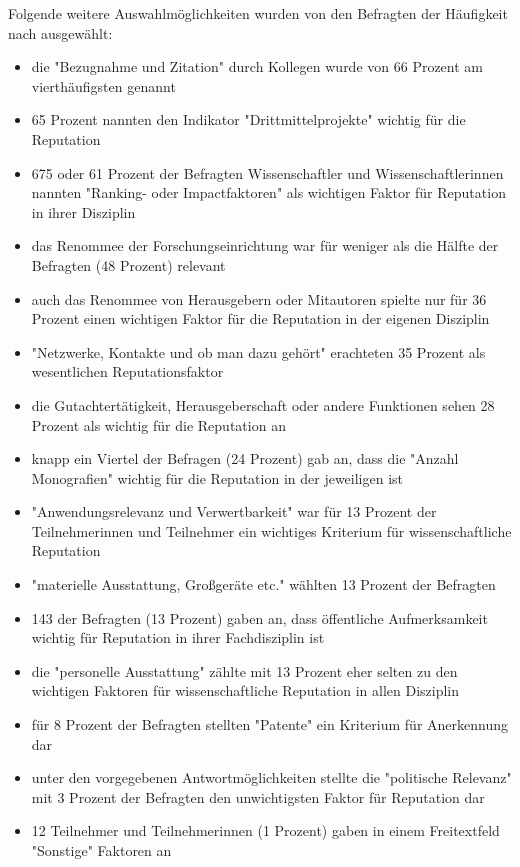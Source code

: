 Folgende weitere Auswahlmöglichkeiten wurden von den Befragten der Häufigkeit nach ausgewählt:
\begin{itemize}
\item die "Bezugnahme und Zitation" durch Kollegen wurde von 66 Prozent am vierthäufigsten genannt
\item 65 Prozent nannten den Indikator "Drittmittelprojekte" wichtig für die Reputation
\item 675 oder 61 Prozent der Befragten Wissenschaftler und Wissenschaftlerinnen nannten "Ranking- oder Impactfaktoren" als wichtigen Faktor für Reputation in ihrer Disziplin
\item das Renommee der Forschungseinrichtung war für weniger als die Hälfte der Befragten (48 Prozent) relevant
\item auch das Renommee von Herausgebern oder Mitautoren spielte nur für 36 Prozent einen wichtigen Faktor für die Reputation in der eigenen Disziplin
\item "Netzwerke, Kontakte und ob man dazu gehört" erachteten 35 Prozent als wesentlichen Reputationsfaktor
\item die Gutachtertätigkeit, Herausgeberschaft oder andere Funktionen sehen 28 Prozent als wichtig für die Reputation an
\item knapp ein Viertel der Befragen (24 Prozent) gab an, dass die "Anzahl Monografien" wichtig für die Reputation in der jeweiligen ist
\item "Anwendungsrelevanz und Verwertbarkeit" war für 13 Prozent der Teilnehmerinnen und Teilnehmer ein wichtiges Kriterium für wissenschaftliche Reputation
\item "materielle Ausstattung, Großgeräte etc." wählten 13 Prozent der Befragten
\item 143 der Befragten (13 Prozent) gaben an, dass öffentliche Aufmerksamkeit wichtig für Reputation in ihrer Fachdisziplin ist
\item die "personelle Ausstattung" zählte mit 13 Prozent eher selten zu den wichtigen Faktoren für wissenschaftliche Reputation in allen Disziplin
\item für 8 Prozent der Befragten stellten "Patente" ein Kriterium für Anerkennung dar
\item unter den vorgegebenen Antwortmöglichkeiten stellte die "politische Relevanz" mit 3 Prozent der Befragten den unwichtigsten Faktor für Reputation dar
\item 12 Teilnehmer und Teilnehmerinnen (1 Prozent) gaben in einem Freitextfeld "Sonstige" Faktoren an
\end{itemize}

